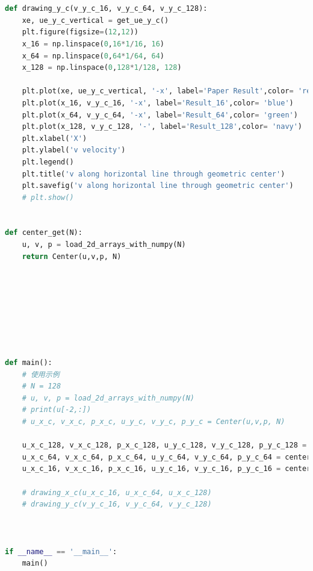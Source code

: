 \documentclass[12pt]{article}
\begin{document}
\begin{scriptsize}
\begin{lstlisting}[language=python,caption={Post Operator:}]
    

def drawing_y_c(v_y_c_16, v_y_c_64, v_y_c_128):
    xe, ue_y_c_vertical = get_ue_y_c()
    plt.figure(figsize=(12,12))
    x_16 = np.linspace(0,16*1/16, 16)
    x_64 = np.linspace(0,64*1/64, 64)
    x_128 = np.linspace(0,128*1/128, 128)

    plt.plot(xe, ue_y_c_vertical, '-x', label='Paper Result',color= 'red')
    plt.plot(x_16, v_y_c_16, '-x', label='Result_16',color= 'blue')
    plt.plot(x_64, v_y_c_64, '-x', label='Result_64',color= 'green')
    plt.plot(x_128, v_y_c_128, '-', label='Result_128',color= 'navy')
    plt.xlabel('X')
    plt.ylabel('v velocity')
    plt.legend()
    plt.title('v along horizontal line through geometric center')
    plt.savefig('v along horizontal line through geometric center')
    # plt.show()


def center_get(N):
    u, v, p = load_2d_arrays_with_numpy(N)
    return Center(u,v,p, N)








def main():
    # 使用示例
    # N = 128
    # u, v, p = load_2d_arrays_with_numpy(N)
    # print(u[-2,:])
    # u_x_c, v_x_c, p_x_c, u_y_c, v_y_c, p_y_c = Center(u,v,p, N)

    u_x_c_128, v_x_c_128, p_x_c_128, u_y_c_128, v_y_c_128, p_y_c_128 = center_get(128)
    u_x_c_64, v_x_c_64, p_x_c_64, u_y_c_64, v_y_c_64, p_y_c_64 = center_get(64)
    u_x_c_16, v_x_c_16, p_x_c_16, u_y_c_16, v_y_c_16, p_y_c_16 = center_get(16)

    # drawing_x_c(u_x_c_16, u_x_c_64, u_x_c_128)
    # drawing_y_c(v_y_c_16, v_y_c_64, v_y_c_128)



if __name__ == '__main__':
    main()

    


\end{lstlisting}





















\end{scriptsize}




\end{document}
